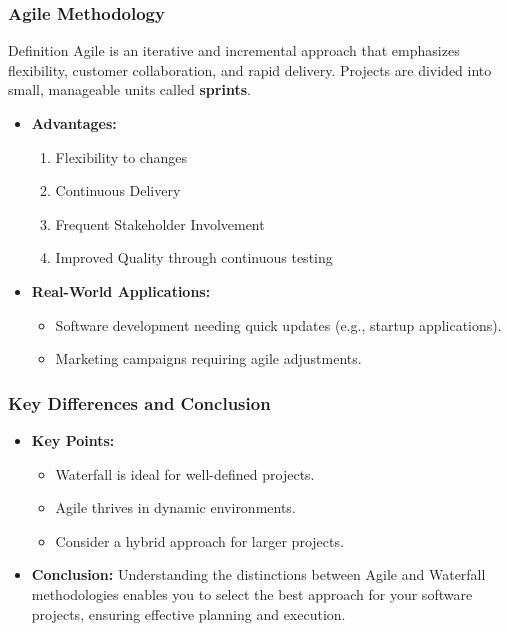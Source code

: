 \documentclass{beamer}
\begin{document}
\begin{frame}[fragile]
    \frametitle{Agile Methodology}
    
    \begin{block}{Definition}
        Agile is an iterative and incremental approach that emphasizes flexibility, customer collaboration, and rapid delivery. Projects are divided into small, manageable units called \textbf{sprints}.
    \end{block}

    \begin{itemize}
        \item \textbf{Advantages:}
        \begin{enumerate}
            \item Flexibility to changes
            \item Continuous Delivery
            \item Frequent Stakeholder Involvement
            \item Improved Quality through continuous testing
        \end{enumerate}

        \item \textbf{Real-World Applications:}
        \begin{itemize}
            \item Software development needing quick updates (e.g., startup applications).
            \item Marketing campaigns requiring agile adjustments.
        \end{itemize}
    \end{itemize}
\end{frame}

\begin{frame}[fragile]
    \frametitle{Key Differences and Conclusion}
    
    \begin{itemize}
        \item \textbf{Key Points:}
        \begin{itemize}
            \item Waterfall is ideal for well-defined projects.
            \item Agile thrives in dynamic environments.
            \item Consider a hybrid approach for larger projects.
        \end{itemize}
        
        \item \textbf{Conclusion:}
        Understanding the distinctions between Agile and Waterfall methodologies enables you to select the best approach for your software projects, ensuring effective planning and execution.
    \end{itemize}
\end{frame}
\end{document}
